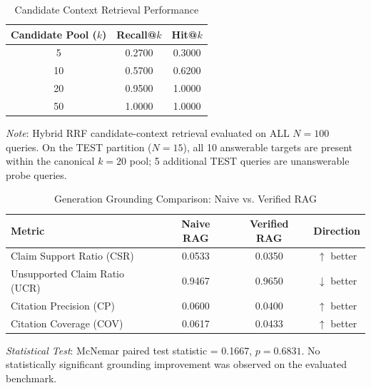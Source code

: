 \begin{table}[t]
\caption{Candidate Context Retrieval Performance}
\label{tab:candidate_retrieval}
\centering
\small
\begin{tabular}{ccc}
\toprule
\textbf{Candidate Pool ($k$)} & \textbf{Recall@$k$} & \textbf{Hit@$k$} \\
\midrule
5  & 0.2700 & 0.3000 \\
10 & 0.5700 & 0.6200 \\
20 & 0.9500 & 1.0000 \\
50 & 1.0000 & 1.0000 \\
\bottomrule
\end{tabular}
\vspace{1ex}
\begin{minipage}{\columnwidth}
\footnotesize
\textit{Note}: Hybrid RRF candidate-context retrieval evaluated on ALL $N=100$ queries. On the TEST partition ($N=15$), all 10 answerable targets are present within the canonical $k=20$ pool; 5 additional TEST queries are unanswerable probe queries.
\end{minipage}
\end{table}

\begin{table}[t]
\caption{Generation Grounding Comparison: Naive vs. Verified RAG}
\label{tab:naive_vs_verified}
\centering
\small
\begin{tabular}{lccc}
\toprule
\textbf{Metric} & \textbf{Naive RAG} & \textbf{Verified RAG} & \textbf{Direction} \\
\midrule
Claim Support Ratio (CSR)         & 0.0533 & 0.0350 & $\uparrow$ better \\
Unsupported Claim Ratio (UCR)     & 0.9467 & 0.9650 & $\downarrow$ better \\
Citation Precision (CP)           & 0.0600 & 0.0400 & $\uparrow$ better \\
Citation Coverage (COV)            & 0.0617 & 0.0433 & $\uparrow$ better \\
\bottomrule
\end{tabular}
\vspace{1ex}
\begin{minipage}{\columnwidth}
\footnotesize
\textit{Statistical Test}: McNemar paired test statistic = 0.1667, $p = 0.6831$. No statistically significant grounding improvement was observed on the evaluated benchmark.
\end{minipage}
\end{table}

